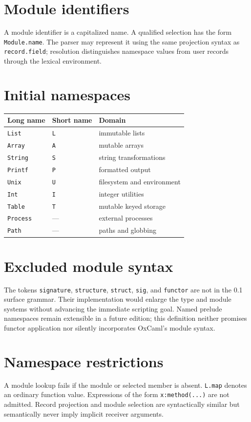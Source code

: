 \documentclass[11pt,oneside,openany]{book}
\newcommand{\kw}[1]{\texttt{#1}}
\begin{document}
\section{Module identifiers}
A module identifier is a capitalized name. A qualified selection has the form \kw{Module.name}. The parser may represent it using the same projection syntax as \kw{record.field}; resolution distinguishes namespace values from user records through the lexical environment.

\section{Initial namespaces}
\begin{center}
\begin{tabular}{lll}
\toprule
Long name & Short name & Domain \\
\midrule
\kw{List} & \kw{L} & immutable lists \\
\kw{Array} & \kw{A} & mutable arrays \\
\kw{String} & \kw{S} & string transformations \\
\kw{Printf} & \kw{P} & formatted output \\
\kw{Unix} & \kw{U} & filesystem and environment \\
\kw{Int} & \kw{I} & integer utilities \\
\kw{Table} & \kw{T} & mutable keyed storage \\
\kw{Process} & --- & external processes \\
\kw{Path} & --- & paths and globbing \\
\bottomrule
\end{tabular}
\end{center}
\section{Excluded module syntax}
The tokens \kw{signature}, \kw{structure}, \kw{struct}, \kw{sig}, and \kw{functor} are not in the 0.1 surface grammar. Their implementation would enlarge the type and module systems without advancing the immediate scripting goal. Named prelude namespaces remain extensible in a future edition; this definition neither promises functor application nor silently incorporates OxCaml's module syntax.

\section{Namespace restrictions}
A module lookup fails if the module or selected member is absent. \kw{L.map} denotes an ordinary function value. Expressions of the form \kw{x:method(...)} are not admitted. Record projection and module selection are syntactically similar but semantically never imply implicit receiver arguments.
\end{document}
